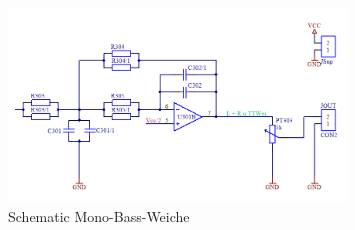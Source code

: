\begin{figure} [H]
	\centering
	\includegraphics[width=0.8\textwidth]{img/Print3/3mTTWeicheruAddiererDiplSchematicTeil2.png}
	\caption{Schematic Mono-Bass-Weiche}
	\label {fig:4.1.3.3}
\end{figure}

